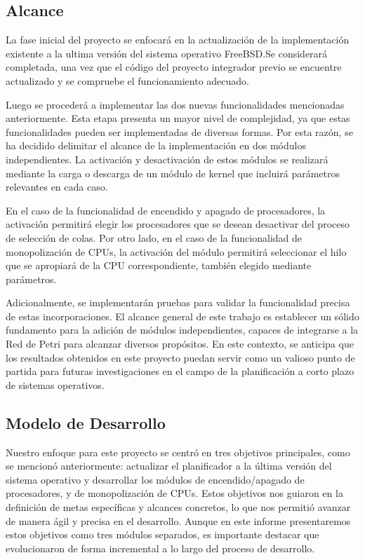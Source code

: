 \subsection{Alcance}

La fase inicial del proyecto se enfocará en la actualización de la implementación existente a la ultima versión del sistema operativo FreeBSD.\@ Se considerará completada, una vez que el código del proyecto integrador previo se encuentre actualizado y se compruebe el funcionamiento adecuado.\par

Luego se procederá a implementar las dos nuevas funcionalidades mencionadas anteriormente. Esta etapa presenta un mayor nivel de complejidad, ya que estas funcionalidades pueden ser implementadas de diversas formas. Por esta razón, se ha decidido delimitar el alcance de la implementación en dos módulos independientes. La activación y desactivación de estos módulos se realizará mediante la carga o descarga de un módulo de kernel que incluirá parámetros relevantes en cada caso.\par

En el caso de la funcionalidad de encendido y apagado de procesadores, la activación permitirá elegir los procesadores que se desean desactivar del proceso de selección de colas. Por otro lado, en el caso de la funcionalidad de monopolización de CPUs, la activación del módulo permitirá seleccionar el hilo que se apropiará de la CPU correspondiente, también elegido mediante parámetros.\par

Adicionalmente, se implementarán pruebas para validar la funcionalidad precisa de estas incorporaciones. El alcance general de este trabajo es establecer un sólido fundamento para la adición de módulos independientes, capaces de integrarse a la Red de Petri para alcanzar diversos propósitos. En este contexto, se anticipa que los resultados obtenidos en este proyecto puedan servir como un valioso punto de partida para futuras investigaciones en el campo de la planificación a corto plazo de sistemas operativos.\par

\subsection{Modelo de Desarrollo}

Nuestro enfoque para este proyecto se centró en tres objetivos principales, como se mencionó anteriormente: actualizar el planificador a la última versión del sistema operativo y desarrollar los módulos de encendido/apagado de procesadores, y de monopolización de CPUs. Estos objetivos nos guiaron en la definición de metas específicas y alcances concretos, lo que nos permitió avanzar de manera ágil y precisa en el desarrollo. Aunque en este informe presentaremos estos objetivos como tres módulos separados, es importante destacar que evolucionaron de forma incremental a lo largo del proceso de desarrollo.

